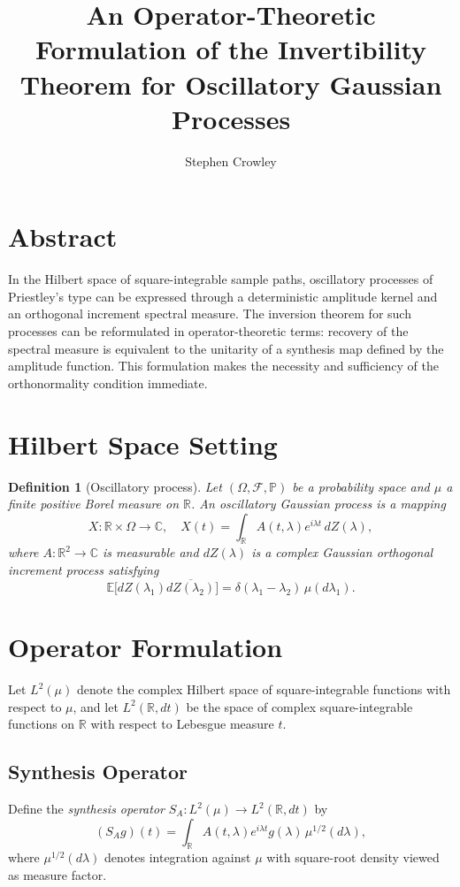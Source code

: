 \documentclass[12pt]{article}
\title{An Operator-Theoretic Formulation of the Invertibility Theorem for Oscillatory Gaussian Processes}
\author{Stephen Crowley}
\date{}
\theoremstyle{plain}
\newtheorem{definition}{Definition}
\begin{document}
\maketitle

\section{Abstract}
In the Hilbert space of square-integrable sample paths, oscillatory processes of Priestley's type can be expressed through a deterministic amplitude kernel and an orthogonal increment spectral measure. The inversion theorem for such processes can be reformulated in operator-theoretic terms: recovery of the spectral measure is equivalent to the unitarity of a synthesis map defined by the amplitude function. This formulation makes the necessity and sufficiency of the orthonormality condition immediate.

\section{Hilbert Space Setting}
\begin{definition}[Oscillatory process]
Let $(\Omega,\mathcal{F},\mathbb{P})$ be a probability space and $\mu$ a finite positive Borel measure on $\mathbb{R}$. An \emph{oscillatory Gaussian process} is a mapping
\[
X:\mathbb{R} \times \Omega \to \mathbb{C}, \quad
X(t) = \int_{\mathbb{R}} A(t,\lambda) e^{i\lambda t} \, dZ(\lambda),
\]
where $A:\mathbb{R}^2 \to \mathbb{C}$ is measurable and $dZ(\lambda)$ is a complex Gaussian orthogonal increment process satisfying
\[
\mathbb{E}\bigl[dZ(\lambda_1) \overline{dZ(\lambda_2)}\bigr] = \delta(\lambda_1 - \lambda_2)\,\mu(d\lambda_1).
\]
\end{definition}

\section{Operator Formulation}
Let $L^2(\mu)$ denote the complex Hilbert space of square-integrable functions with respect to $\mu$, and let $L^2(\mathbb{R},dt)$ be the space of complex square-integrable functions on $\mathbb{R}$ with respect to Lebesgue measure $t$.

\subsection{Synthesis Operator}
Define the \emph{synthesis operator} $S_A : L^2(\mu) \to L^2(\mathbb{R},dt)$ by
\[
(S_A g)(t) = \int_{\mathbb{R}} A(t,\lambda) e^{i\lambda t} g(\lambda) \,\mu^{1/2}(d\lambda),
\]
where $\mu^{1/2}(d\lambda)$ denotes integration against $\mu$ with square-root density viewed as measure factor.
\end{document}
